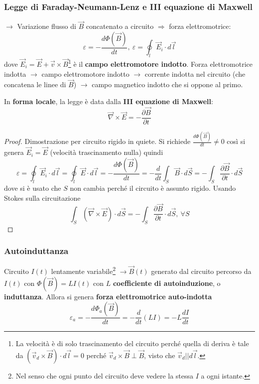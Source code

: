 \documentclass[a4paper]{scrartcl}
\numberwithin{equation}{subsection}
\theoremstyle{style1}
\newenvironment{boxenv}[1][]{
    \begin{eqbox}[#1]
    }{
   \end{eqbox}
}
\begin{document}
\subsubsection{Legge di Faraday-Neumann-Lenz e III equazione di Maxwell}
$\to$ Variazione flusso di $\vec{B}$ concatenato a circuito $\Rightarrow $ forza elettromotrice:
\begin{equation}
	\varepsilon  = - \frac{d \Phi(\vec{B})}{d t}, \ \varepsilon = \oint_{l} \vec{E}_i \cdot d\vec{l}
\end{equation}
dove $\vec{E}_i = \vec{E}+ \vec{v}\times \vec{B}$\footnote{La velocit\`a \`e di solo trascinamento del circuito perch\'e quella di deriva \`e tale da $(\vec{v}_d \times \vec{B}) \cdot d\vec{l}=0$ perch\'e $\vec{v}_d \times \vec{B}\perp \vec{B}$, visto che $\vec{v}_d | | d\vec{l}$.} \`e il \textbf{campo elettromotore indotto}. Forza elettromotrice indotta $\to$ campo elettromotore indotto $\to$ corrente indotta nel circuito (che concatena le linee di $\vec{B}$) $\to$ campo magnetico indotto che si oppone al primo.

In \textbf{forma locale}, la legge \`e data dalla \textbf{III equazione di Maxwell}:
\begin{equation}
	\vec{\nabla }\times \vec{E} = - \frac{\partial \vec{B}}{\partial t} 
\end{equation}
\begin{boxenv}[]
\begin{proof}
	Dimostrazione per circuito rigido in quiete. Si richiede $\frac{d \Phi(\vec{B})}{d t} \neq 0$ cos\`i si genera $\vec{E}_i = \vec{E}$ (velocit\`a trascinamento nulla) quindi
	\[
	\varepsilon  = \oint_{l} \vec{E}_i \cdot d\vec{l}=\oint_{l} \vec{E}\cdot d\vec{l} = - \frac{d \Phi(\vec{B})}{d t} = - \frac{d }{d t} \int_{S} \vec{B}\cdot d\vec{S} = - \int_{S} \frac{\partial \vec{B}}{\partial t} \cdot d\vec{S}
	\] 
	dove si \`e usato che $S$ non cambia perch\'e il circuito \`e assunto rigido. Usando Stokes sulla circuitazione
	\begin{equation*}
		\int_{S} (\vec{\nabla }\times \vec{E}) \cdot d\vec{S}=- \int_{S} \frac{\partial \vec{B}}{\partial t} \cdot d\vec{S}, \ \forall S
	\end{equation*}
\end{proof}
\end{boxenv}
\subsubsection{Autoinduttanza}

Circuito $I(t)$ lentamente variabile\footnote{Nel senso che ogni punto del circuito deve vedere la stessa $I$ a ogni istante.} $\to \vec{B}(t)$ generato dal circuito percorso da $I(t)$ con $ \Phi(\vec{B}) = L I(t)$ con $L$ \textbf{coefficiente di autoinduzione}, o \textbf{induttanza}. Allora si genera \textbf{forza elettromotrice auto-indotta} 
\begin{equation}
	\varepsilon _a = - \frac{d \Phi_a(\vec{B})}{dt} = - \frac{d }{d t} (LI) = - L \frac{d I}{d t} 
\end{equation}
\end{document}
